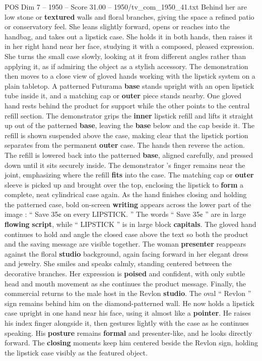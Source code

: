 \begin{textsample}{POS Dim 7 – 1950 – Score 31.00 – 1950/tv\_com\_1950\_41.txt}
Behind her are low stone or \textbf{textured} walls and floral branches, giving the space a refined patio or conservatory feel.
She leans slightly forward, opens or reaches into the handbag, and takes out a lipstick case.
She holds it in both hands, then raises it in her right hand near her face, studying it with a composed, pleased expression.
She turns the small case slowly, looking at it from different angles rather than applying it, as if admiring the object as a stylish accessory.
The demonstration then moves to a close view of gloved hands working with the lipstick system on a plain tabletop.
A patterned Futurama \textbf{base} stands upright with an open lipstick tube inside it, and a matching cap or \textbf{outer} piece stands nearby.
One gloved hand rests behind the product for support while the other points to the central refill section.
The demonstrator grips the \textbf{inner} lipstick refill and lifts it straight up out of the patterned \textbf{base}, leaving the \textbf{base} below and the cap beside it.
The refill is shown suspended above the case, making clear that the lipstick portion separates from the permanent \textbf{outer} case.
The hands then reverse the action.
The refill is lowered back into the patterned \textbf{base}, aligned carefully, and pressed down until it sits securely inside.
The demonstrator ’s finger remains near the joint, emphasizing where the refill \textbf{fits} into the case.
The matching cap or \textbf{outer} sleeve is picked up and brought over the top, enclosing the lipstick to \textbf{form} a complete, neat cylindrical case again.
As the hand finishes closing and holding the patterned case, bold on-screen \textbf{writing} appears across the lower part of the image : “ Save 35¢ on every LIPSTICK. ” The words “ Save 35¢ ” are in large \textbf{flowing} \textbf{script}, while “ LIPSTICK ” is in large block \textbf{capitals}.
The gloved hand continues to hold and angle the closed case above the text so both the product and the saving message are visible together.
The woman \textbf{presenter} reappears against the floral \textbf{studio} background, again facing forward in her elegant dress and jewelry.
She smiles and speaks calmly, standing centered between the decorative branches.
Her expression is \textbf{poised} and confident, with only subtle head and mouth movement as she continues the product message.
Finally, the commercial returns to the male host in the Revlon \textbf{studio}.
The oval “ Revlon ” sign remains behind him on the diamond-patterned wall.
He now holds a lipstick case upright in one hand near his face, using it almost like a \textbf{pointer}.
He raises his index finger alongside it, then gestures lightly with the case as he continues speaking.
His \textbf{posture} remains \textbf{formal} and presenter-like, and he looks directly forward.
The \textbf{closing} moments keep him centered beside the Revlon sign, holding the lipstick case visibly as the featured object.

\end{textsample}
